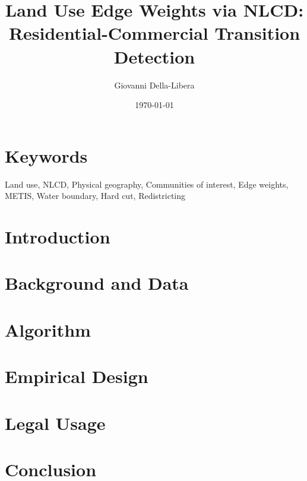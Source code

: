 \documentclass[12pt]{article}
\title{\textbf{Land Use Edge Weights via NLCD:\\
Residential-Commercial Transition Detection}}
\author{Giovanni Della-Libera}
\date{\today}
\begin{document}
\maketitle

\begin{abstract}

\end{abstract}

\section*{Keywords}
Land use, NLCD, Physical geography, Communities of interest, Edge weights,
METIS, Water boundary, Hard cut, Redistricting

\section{Introduction}


\section{Background and Data}


\section{Algorithm}


\section{Empirical Design}


\section{Legal Usage}


\section{Conclusion}




\end{document}
